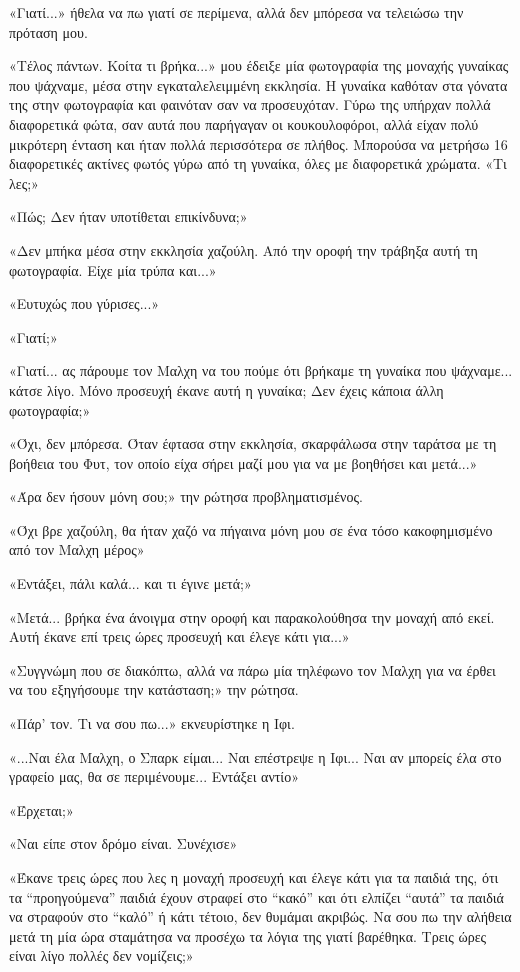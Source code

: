 \documentclass[12pt,twoside, openany]{book}
\begin{document}
«Γιατί...» ήθελα να πω γιατί σε περίμενα, αλλά δεν μπόρεσα να τελειώσω την πρόταση μου.

«Τέλος πάντων. Κοίτα τι βρήκα...» μου έδειξε μία φωτογραφία της μοναχής γυναίκας που ψάχναμε, μέσα στην εγκαταλελειμμένη εκκλησία. Η γυναίκα καθόταν στα γόνατα της στην φωτογραφία και φαινόταν σαν να προσευχόταν. Γύρω της υπήρχαν πολλά διαφορετικά φώτα, σαν αυτά που παρήγαγαν οι κουκουλοφόροι, αλλά είχαν πολύ μικρότερη ένταση και ήταν πολλά περισσότερα σε πλήθος. Μπορούσα να μετρήσω 16 διαφορετικές ακτίνες φωτός γύρω από τη γυναίκα, όλες με διαφορετικά χρώματα. «Τι λες;»

«Πώς; Δεν ήταν υποτίθεται επικίνδυνα;»

«Δεν μπήκα μέσα στην εκκλησία χαζούλη. Από την οροφή την τράβηξα αυτή τη φωτογραφία. Είχε μία τρύπα και...»

«Ευτυχώς που γύρισες...»

«Γιατί;»

«Γιατί... ας πάρουμε τον Μαλχη να του πούμε ότι βρήκαμε τη γυναίκα που ψάχναμε... κάτσε λίγο. Μόνο προσευχή έκανε αυτή η γυναίκα; Δεν έχεις κάποια άλλη φωτογραφία;»

«Όχι, δεν μπόρεσα. Όταν έφτασα στην εκκλησία, σκαρφάλωσα στην ταράτσα με τη βοήθεια του Φυτ, τον οποίο είχα σήρει μαζί μου για να με βοηθήσει και μετά...»

«Άρα δεν ήσουν μόνη σου;» την ρώτησα προβληματισμένος.

«Όχι βρε χαζούλη, θα ήταν χαζό να πήγαινα μόνη μου σε ένα τόσο κακοφημισμένο από τον Μαλχη μέρος»

«Εντάξει, πάλι καλά... και τι έγινε μετά;»

«Μετά... βρήκα ένα άνοιγμα στην οροφή και παρακολούθησα την μοναχή από εκεί. Αυτή έκανε επί τρεις ώρες προσευχή και έλεγε κάτι για...»

«Συγγνώμη που σε διακόπτω, αλλά να πάρω μία τηλέφωνο τον Μαλχη για να έρθει να του εξηγήσουμε την κατάσταση;» την ρώτησα.

«Πάρ’ τον. Τι να σου πω...» εκνευρίστηκε η Ιφι.

«...Ναι έλα Μαλχη, ο Σπαρκ είμαι... Ναι επέστρεψε η Ιφι... Ναι αν μπορείς έλα στο γραφείο μας, θα σε περιμένουμε... Εντάξει αντίο»

«Έρχεται;»

«Ναι είπε στον δρόμο είναι. Συνέχισε»

«Έκανε τρεις ώρες που λες η μοναχή προσευχή και έλεγε κάτι για τα παιδιά της, ότι τα “προηγούμενα” παιδιά έχουν στραφεί στο “κακό” και ότι ελπίζει “αυτά” τα παιδιά να στραφούν στο “καλό” ή κάτι τέτοιο, δεν θυμάμαι ακριβώς. Να σου πω την αλήθεια μετά τη μία ώρα σταμάτησα να προσέχω τα λόγια της γιατί βαρέθηκα. Τρεις ώρες είναι λίγο πολλές δεν νομίζεις;»
\end{document}
